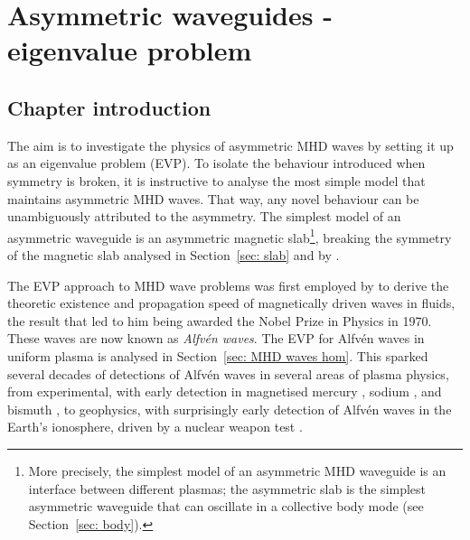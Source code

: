 \documentclass[12pt,draft]{../style-files/ociamthesis}
\begin{document}
\baselineskip=18pt

\setcounter{secnumdepth}{3}
\setcounter{tocdepth}{3}

\setcounter{chapter}{1}


\newcommand{\bv}{\mathbf{v}}
\newcommand{\bB}{\mathbf{B}}


\newcommand{\figdir}{../main/figures/chpt-2/} %

\chapter{Asymmetric waveguides - eigenvalue problem}
\label{chap: EVP}


\section{Chapter introduction}
\label{sec: EVP intro}

The aim is to investigate the physics of asymmetric MHD waves by setting it up as an eigenvalue problem (EVP). To isolate the behaviour introduced when symmetry is broken, it is instructive to analyse the most simple model that maintains asymmetric MHD waves. That way, any novel behaviour can be unambiguously attributed to the asymmetry. The simplest model of an asymmetric waveguide is an asymmetric magnetic slab\footnote{More precisely, the simplest model of an asymmetric MHD waveguide is an interface between different plasmas; the asymmetric slab is the simplest asymmetric waveguide that can oscillate in a collective body mode (see Section~\ref{sec: body}).}, breaking the symmetry of the magnetic slab analysed in Section~\ref{sec: slab} and by \cite{rob81b}.

The EVP approach to MHD wave problems was first employed by \cite{alf42} to derive the theoretic existence and propagation speed of magnetically driven waves in fluids, the result that led to him being awarded the Nobel Prize in Physics in 1970. These waves are now known as \textit{Alfv\'{e}n waves}. The EVP for Alfv\'{e}n waves in uniform plasma is analysed in Section~\ref{sec: MHD waves hom}. This sparked several decades of detections of Alfv\'{e}n waves in several areas of plasma physics, from experimental, with early detection in magnetised mercury \citep{lun49}, sodium \citep{leh54}, and bismuth \citep{hes_etal73}, to geophysics, with surprisingly early detection of Alfv\'{e}n waves in the Earth's ionosphere, driven by a nuclear weapon test \citep{ber_etal60}.
\end{document}
